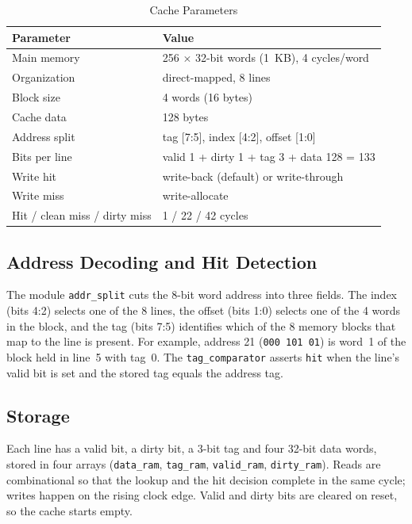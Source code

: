 \documentclass[conference]{IEEEtran}
\newcommand{\sig}[1]{\texttt{#1}}
\begin{document}
\begin{table}[t]
\caption{Cache Parameters}
\label{tab:params}
\centering
\footnotesize
\begin{tabular}{@{}ll@{}}
\toprule
Parameter & Value \\
\midrule
Main memory & 256 $\times$ 32-bit words (1~KB), 4 cycles/word \\
Organization & direct-mapped, 8 lines \\
Block size & 4 words (16 bytes) \\
Cache data & 128 bytes \\
Address split & tag [7:5], index [4:2], offset [1:0] \\
Bits per line & valid 1 + dirty 1 + tag 3 + data 128 = 133 \\
Write hit & write-back (default) or write-through \\
Write miss & write-allocate \\
Hit / clean miss / dirty miss & 1 / 22 / 42 cycles \\
\bottomrule
\end{tabular}
\end{table}

\subsection{Address Decoding and Hit Detection}
The module \sig{addr\_split} cuts the 8-bit word address into three fields. The index (bits 4:2) selects one of the 8 lines, the offset (bits 1:0) selects one of the 4 words in the block, and the tag (bits 7:5) identifies which of the 8 memory blocks that map to the line is present. For example, address 21 (\texttt{000\,101\,01}) is word~1 of the block held in line~5 with tag~0. The \sig{tag\_comparator} asserts \sig{hit} when the line's valid bit is set and the stored tag equals the address tag.

\subsection{Storage}
Each line has a valid bit, a dirty bit, a 3-bit tag and four 32-bit data words, stored in four arrays (\sig{data\_ram}, \sig{tag\_ram}, \sig{valid\_ram}, \sig{dirty\_ram}). Reads are combinational so that the lookup and the hit decision complete in the same cycle; writes happen on the rising clock edge. Valid and dirty bits are cleared on reset, so the cache starts empty.
\end{document}
